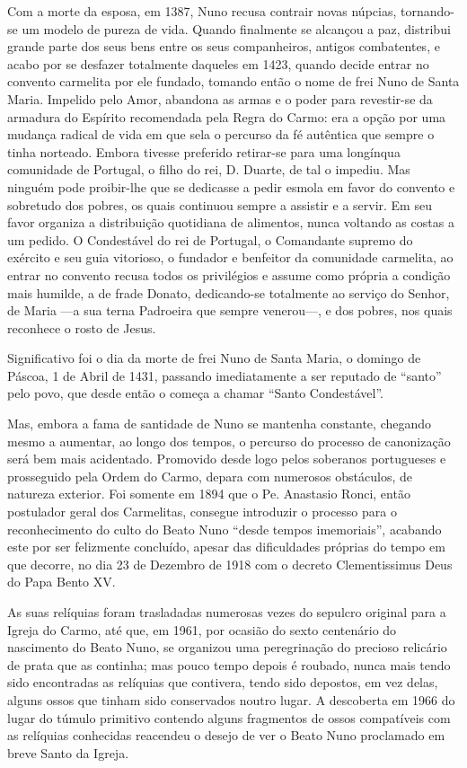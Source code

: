 \documentclass[a4paper,14pt]{extarticle} \usepackage[utf8]{inputenc}
\begin{document}
Com a morte da esposa, em 1387, Nuno recusa contrair novas núpcias, tornando-se um modelo de pureza de vida. Quando finalmente se alcançou a paz, distribui grande parte dos seus bens entre os seus companheiros, antigos combatentes, e acabo por se desfazer totalmente daqueles em 1423, quando decide entrar no convento carmelita por ele fundado, tomando então o nome de frei Nuno de Santa Maria. Impelido pelo Amor, abandona as armas e o poder para revestir-se da armadura do Espírito recomendada pela Regra do Carmo: era a opção por uma mudança radical de vida em que sela o percurso da fé autêntica que sempre o tinha norteado. Embora tivesse preferido retirar-se para uma longínqua comunidade de Portugal, o filho do rei, D. Duarte, de tal o impediu. Mas ninguém pode proibir-lhe que se dedicasse a pedir esmola em favor do convento e sobretudo dos pobres, os quais continuou sempre a assistir e a servir. Em seu favor organiza a distribuição quotidiana de alimentos, nunca voltando as costas a um pedido. O Condestável do rei de Portugal, o Comandante supremo do exército e seu guia vitorioso, o fundador e benfeitor da comunidade carmelita, ao entrar no convento recusa todos os privilégios e assume como própria a condição mais humilde, a de frade Donato, dedicando-se totalmente ao serviço do Senhor, de Maria —a sua terna Padroeira que sempre venerou—, e dos pobres, nos quais reconhece o rosto de Jesus.

Significativo foi o dia da morte de frei Nuno de Santa Maria, o domingo de Páscoa, 1 de Abril de 1431, passando imediatamente a ser reputado de “santo” pelo povo, que desde então o começa a chamar “Santo Condestável”.

Mas, embora a fama de santidade de Nuno se mantenha constante, chegando mesmo a aumentar, ao longo dos tempos, o percurso do processo de canonização será bem mais acidentado. Promovido desde logo pelos soberanos portugueses e prosseguido pela Ordem do Carmo, depara com numerosos obstáculos, de natureza exterior. Foi somente em 1894 que o Pe. Anastasio Ronci, então postulador geral dos Carmelitas, consegue introduzir o processo para o reconhecimento do culto do Beato Nuno “desde tempos imemoriais”, acabando este por ser felizmente concluído, apesar das dificuldades próprias do tempo em que decorre, no dia 23 de Dezembro de 1918 com o decreto Clementissimus Deus do Papa Bento XV.

As suas relíquias foram trasladadas numerosas vezes do sepulcro original para a Igreja do Carmo, até que, em 1961, por ocasião do sexto centenário do nascimento do Beato Nuno, se organizou uma peregrinação do precioso relicário de prata que as continha; mas pouco tempo depois é roubado, nunca mais tendo sido encontradas as relíquias que contivera, tendo sido depostos, em vez delas, alguns ossos que tinham sido conservados noutro lugar. A descoberta em 1966 do lugar do túmulo primitivo contendo alguns fragmentos de ossos compatíveis com as relíquias conhecidas reacendeu o desejo de ver o Beato Nuno proclamado em breve Santo da Igreja.
\end{document}
